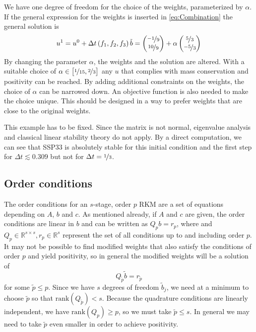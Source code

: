 \documentclass[a4paper]{article}
\numberwithin{equation}{section}
\theoremstyle{plain}
\theoremstyle{definition}
\numberwithin{theorem}{section}
\newcommand{\dt}{{\Delta t}}
\newcommand{\1}{\mathbbm{1}}
\newcommand{\bt}{\tilde{b}}
\newcommand{\pt}{{\tilde{p}}}
\newcommand{\todo}[1]{{\Large{\color{red}{#1}}}}
\begin{document}
We have one degree of freedom for the choice of the weights,
parameterized by $\alpha$.
If the general expression for the weights is inserted in \eqref{eq:Combination} the general solution is 
\begin{equation}
u^{1} = u^0 + \dt  \left(f_1, f_2, f_3\right) \bt =
\begin{pmatrix} \nicefrac{-1}{9}\\\nicefrac{10}{9}\end{pmatrix}
+\alpha \begin{pmatrix}\nicefrac{5}{3}\\ \nicefrac{-5}{3}\end{pmatrix}
\end{equation}
By changing the parameter $\alpha$, the weights and the solution are altered.
With a suitable choice of $\alpha \in \left[\nicefrac{1}{15},\nicefrac{2}{3}\right]$ any $u$ that complies with mass conservation and positivity can be reached.
By adding additional constraints on the weights, the choice of $\alpha$ can be narrowed down. 
An objective function is also needed to make the choice unique. This should be designed in a way to prefer weights that are close to the original weights.


\todo{Note (HR)} %
This example has to be fixed.
Since the matrix is not normal, eigenvalue analysis
and classical linear stability theory do not apply. By a direct
computation, we can see that SSP33 is absolutely stable for this
initial condition and the first step for $\dt \lesssim 0.309$
but not for $\dt = \nicefrac{1}{3}$.


\subsection{Order conditions}\label{sec:OrderCond}

The order conditions for an $s$-stage, order $p$ RKM are a set of equations depending on $A$, $b$ and
$c$.  As mentioned already, if $A$ and $c$ are given, the order conditions are
linear in $b$ and can be written as $Q_p b = r_p$, where
and $Q_p\in{\mathbb R}^{s\times s}, r_p\in{\mathbb R}^s$ represent the set of all conditions up to
and including order $p$.  It may not be possible to find modified weights
that also satisfy the conditions of order $p$ and yield positivity, so
in general the modified weights will be a solution of
$$
  Q_\pt \bt = r_\pt
$$
for some $\pt \le p$.   Since we have $s$ degrees of freedom $\bt_j$,  we need
at a minimum to choose $\pt$ so that $\mathrm{rank}(Q_\pt) < s$. 
Because the quadrature conditions are linearly independent, we have $\mathrm{rank}(Q_p)\ge p$,
so we must take $\pt \le s$.  In general we may need to take $\pt$ even smaller
in order to achieve positivity.
\end{document}
